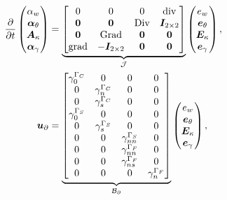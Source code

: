 \begin{equation}\label{eq:phsysMin}
\begin{aligned}
\displaystyle
\diffp{}{t}
\begin{pmatrix}
\alpha_w \\
\bm\alpha_\theta \\
\bm{A}_\kappa \\
\bm\alpha_{\gamma} \\
\end{pmatrix} &= 
\underbrace{\begin{bmatrix}
0  & 0  & 0  & \div \\
\bm{0} & \bm{0} &  \Div & \bm{I}_{2 \times 2}\\
\bm{0}  & \Grad  & \bm{0}  & \bm{0}\\
\grad & -\bm{I}_{2 \times 2} &  \bm{0} & \bm{0} \\
\end{bmatrix}}_{\mathcal{J}}
\begin{pmatrix}
e_w \\
\bm{e}_{\theta} \\
\bm{E}_{\kappa} \\
\bm{e}_{\gamma} \\
\end{pmatrix}, \vspace{3pt}\\
\bm{u}_\partial &= \underbrace{
\begin{bmatrix}
\gamma_{0}^{\Gamma_C} & {0} & {0} & {0} \\
{0} & \gamma_n^{\Gamma_C} &  {0} & {0} \\
{0} & \gamma_s^{\Gamma_C} &  {0} & {0} \\
\gamma_{0}^{\Gamma_S} & {0} & {0} & {0} \\
{0} & \gamma_s^{\Gamma_S} & {0} & {0} \\
{0} &  {0} & \gamma_{nn}^{\Gamma_S} & {0} \\
{0} &  {0} & \gamma_{nn}^{\Gamma_F} & {0} \\
{0} &  {0} & \gamma_{ns}^{\Gamma_F} & {0} \\
{0} &  {0} & {0} & \gamma_{n}^{\Gamma_F} \\
\end{bmatrix}}_{\mathcal{B}_\partial} \begin{pmatrix}
e_w \\
\bm{e}_{\theta} \\
\bm{E}_{\kappa} \\
\bm{e}_{\gamma} \\
\end{pmatrix}, \vspace{3pt}\\

\end{aligned}
\end{equation}
